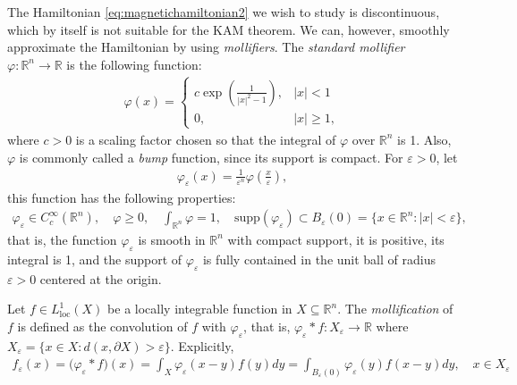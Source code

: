 The Hamiltonian \eqref{eq:magnetichamiltonian2} we wish to study is discontinuous, which by itself is not suitable for the KAM theorem. We can, however, smoothly approximate the Hamiltonian by using \textit{mollifiers}. The \textit{standard mollifier} $\varphi:\mathbb R^n\to\mathbb R$ is the following function:
\begin{align*}
\varphi(x) = \left\{\begin{array}{ll}
c\exp\left(\frac{1}{|x|^2-1}\right), & |x| <1\\
0, & |x|\ge 1,
\end{array}
\right.
\end{align*}
where $c>0$ is a scaling factor chosen so that the integral of $\varphi$ over $\mathbb R^n$ is 1. Also, $\varphi$ is commonly called a \textit{bump} function, since its support is compact. For $\varepsilon>0$, let
\begin{align*}
\varphi_\varepsilon(x) = \frac{1}{\varepsilon^n}\varphi\left(\frac{x}{\varepsilon}\right),
\end{align*} 
this function has the following properties:
\begin{align*}
\varphi_\varepsilon\in C_c^\infty(\mathbb R^n),\quad
\varphi\ge 0,\quad
\int_{\mathbb R^n}\varphi =1,\quad
\text{supp}(\varphi_\varepsilon)\subset B_\varepsilon(0)=\{x\in\mathbb R^n:|x|<\varepsilon\},
\end{align*}
that is, the function $\varphi_\varepsilon$ is smooth in $\mathbb R^n$ with compact support, it is positive, its integral is 1, and the support of $\varphi_\varepsilon$ is fully contained in the unit ball of radius $\varepsilon>0$ centered at the origin.
  
Let $f\in L_{\text{loc}}^1(X)$ be a locally integrable function in $X \subseteq\mathbb R^n$. The \textit{mollification} of $f$ is defined as the convolution of $f$ with $\varphi_\varepsilon$, that is, $\varphi_\varepsilon*f:X_\varepsilon\to\mathbb R$ where $X_\varepsilon=\{x\in X: d(x,\partial X)>\varepsilon\}$. Explicitly,
\begin{align*}
f_\varepsilon(x) = \big(\varphi_\varepsilon * f\big)(x) = \int_X\varphi_\varepsilon(x-y)f(y)dy = \int_{B_\varepsilon(0)}\varphi_\varepsilon(y)f(x-y)dy,\quad x\in X_\varepsilon
\end{align*}


